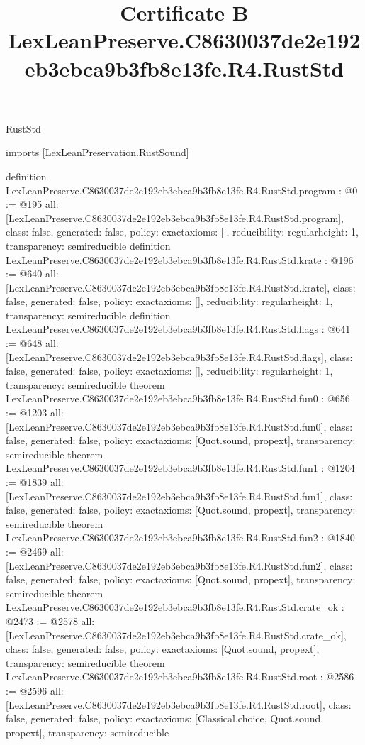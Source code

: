 \begin{lexlean}{RustStd}
\title{Certificate B LexLeanPreserve.C8630037de2e192eb3ebca9b3fb8e13fe.R4.RustStd}
\begin{coremodule}
imports [LexLeanPreservation.RustSound]

definition LexLeanPreserve.C8630037de2e192eb3ebca9b3fb8e13fe.R4.RustStd.program : @0 := @195 {
  all: [LexLeanPreserve.C8630037de2e192eb3ebca9b3fb8e13fe.R4.RustStd.program],
  class: false,
  generated: false,
  policy: exact{axioms: []},
  reducibility: regular{height: 1},
  transparency: semireducible
}
definition LexLeanPreserve.C8630037de2e192eb3ebca9b3fb8e13fe.R4.RustStd.krate : @196 := @640 {
  all: [LexLeanPreserve.C8630037de2e192eb3ebca9b3fb8e13fe.R4.RustStd.krate],
  class: false,
  generated: false,
  policy: exact{axioms: []},
  reducibility: regular{height: 1},
  transparency: semireducible
}
definition LexLeanPreserve.C8630037de2e192eb3ebca9b3fb8e13fe.R4.RustStd.flags : @641 := @648 {
  all: [LexLeanPreserve.C8630037de2e192eb3ebca9b3fb8e13fe.R4.RustStd.flags],
  class: false,
  generated: false,
  policy: exact{axioms: []},
  reducibility: regular{height: 1},
  transparency: semireducible
}
theorem LexLeanPreserve.C8630037de2e192eb3ebca9b3fb8e13fe.R4.RustStd.fun0 : @656 := @1203 {
  all: [LexLeanPreserve.C8630037de2e192eb3ebca9b3fb8e13fe.R4.RustStd.fun0],
  class: false,
  generated: false,
  policy: exact{axioms: [Quot.sound, propext]},
  transparency: semireducible
}
theorem LexLeanPreserve.C8630037de2e192eb3ebca9b3fb8e13fe.R4.RustStd.fun1 : @1204 := @1839 {
  all: [LexLeanPreserve.C8630037de2e192eb3ebca9b3fb8e13fe.R4.RustStd.fun1],
  class: false,
  generated: false,
  policy: exact{axioms: [Quot.sound, propext]},
  transparency: semireducible
}
theorem LexLeanPreserve.C8630037de2e192eb3ebca9b3fb8e13fe.R4.RustStd.fun2 : @1840 := @2469 {
  all: [LexLeanPreserve.C8630037de2e192eb3ebca9b3fb8e13fe.R4.RustStd.fun2],
  class: false,
  generated: false,
  policy: exact{axioms: [Quot.sound, propext]},
  transparency: semireducible
}
theorem LexLeanPreserve.C8630037de2e192eb3ebca9b3fb8e13fe.R4.RustStd.crate_ok : @2473 := @2578 {
  all: [LexLeanPreserve.C8630037de2e192eb3ebca9b3fb8e13fe.R4.RustStd.crate_ok],
  class: false,
  generated: false,
  policy: exact{axioms: [Quot.sound, propext]},
  transparency: semireducible
}
theorem LexLeanPreserve.C8630037de2e192eb3ebca9b3fb8e13fe.R4.RustStd.root : @2586 := @2596 {
  all: [LexLeanPreserve.C8630037de2e192eb3ebca9b3fb8e13fe.R4.RustStd.root],
  class: false,
  generated: false,
  policy: exact{axioms: [Classical.choice, Quot.sound, propext]},
  transparency: semireducible
}


\end{coremodule}
\end{lexlean}
